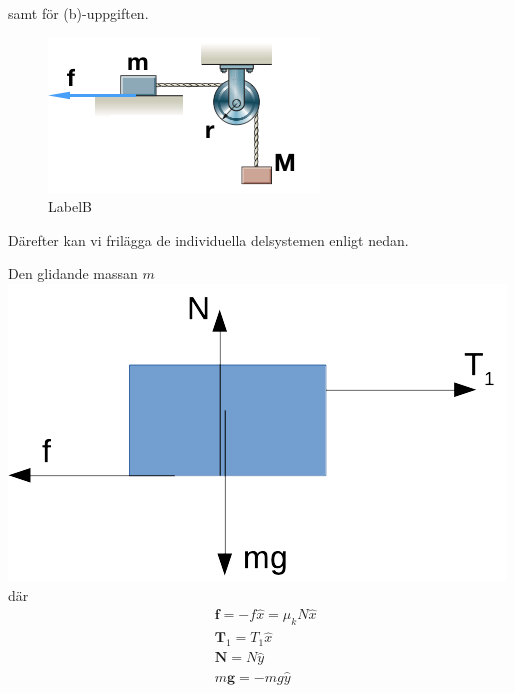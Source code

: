 \documentclass[11pt]{article}
\begin{document}
samt för (b)-uppgiften.

\begin{figure}
\centering
\includegraphics{./BF18_17b.png}
\caption{LabelB}
\end{figure}

Därefter kan vi frilägga de individuella delsystemen enligt nedan.

Den glidande massan \(m\) \includegraphics{./BF18_17mf.png} där
\begin{align}
&\mathbf{f} =-f\hat{x}=\mu_k N \hat{x} \\
&\mathbf{T}_1 =T_1\hat{x} \\
&\mathbf{N} =N\hat{y} \\
&m\mathbf{g} =-mg\hat{y}
\end{align}
\end{document}
